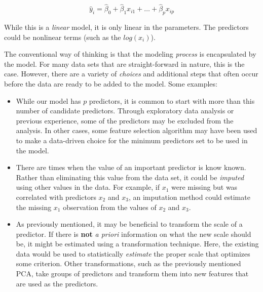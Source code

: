 \documentclass[11pt]{book}
\providecommand{\tightlist}{%
  \setlength{\itemsep}{0pt}\setlength{\parskip}{0pt}}
\begin{document}
\[ \hat{y}_i = \hat{\beta}_0 + \hat{\beta}_1x_{i1} + \ldots + \hat{\beta}_px_{ip} \]

While this is a \emph{linear} model, it is only linear in the parameters. The predictors could be nonlinear terms (such as the \(log(x_i)\)).

The conventional way of thinking is that the modeling \emph{process} is encapsulated by the model. For many data sets that are straight-forward in nature, this is the case. However, there are a variety of \emph{choices} and additional steps that often occur before the data are ready to be added to the model. Some examples:

\begin{itemize}
\tightlist
\item
  While our model has \(p\) predictors, it is common to start with more than this number of candidate predictors. Through exploratory data analysis or previous experience, some of the predictors may be excluded from the analysis. In other cases, some feature selection algorithm may have been used to make a data-driven choice for the minimum predictors set to be used in the model.
\item
  There are times when the value of an important predictor is know known. Rather than eliminating this value from the data set, it could be \emph{imputed} using other values in the data. For example, if \(x_1\) were missing but was correlated with predictors \(x_2\) and \(x_3\), an imputation method could estimate the missing \(x_1\) observation from the values of \(x_2\) and \(x_3\).
\item
  As previously mentioned, it may be beneficial to transform the scale of a predictor. If there is \textbf{not} \emph{a priori} information on what the new scale should be, it might be estimated using a transformation technique. Here, the existing data would be used to statistically \emph{estimate} the proper scale that optimizes some criterion. Other transformations, such as the previously mentioned PCA, take groups of predictors and transform them into new features that are used as the predictors.
\end{itemize}
\end{document}
